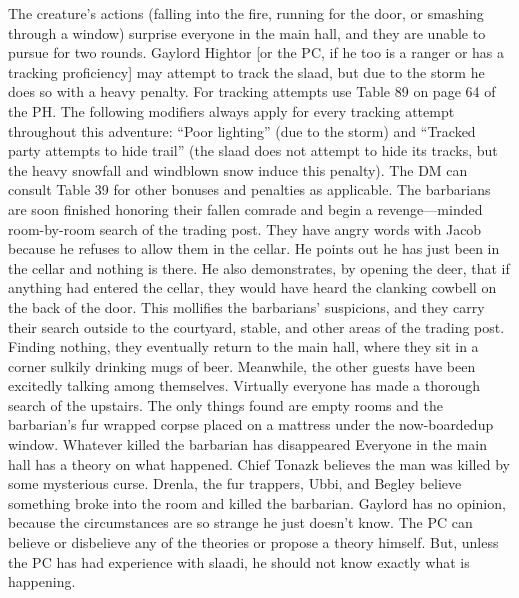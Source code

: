 \documentclass[a5paper,11pt,twoside]{book}
\begin{document}
{{{The creature’s actions (falling into the fire, running for the door, or smashing through a window) surprise everyone in the main hall, and they are unable to pursue for two rounds.
Gaylord Hightor [or the PC, if he too is a ranger or has a tracking proficiency] may attempt to track the slaad, but due to the storm he does so with a heavy penalty.
For tracking attempts use Table 89 on page 64 of the PH.
The following modifiers always apply for every tracking attempt throughout this adventure: “Poor lighting” (due to the storm) and “Tracked party attempts to hide trail” (the slaad does not attempt to hide its tracks, but the heavy snowfall and windblown snow induce this penalty).
The DM can consult Table 39 for other bonuses and penalties as applicable.
The barbarians are soon finished honoring their fallen comrade and begin a revenge—minded room-by-room search of the trading post.
They have angry words with Jacob because he refuses to allow them in the cellar.
He points out he has just been in the cellar and nothing is there.
He also demonstrates, by opening the deer, that if anything had entered the cellar, they would have heard the clanking cowbell on the back of the door.
This mollifies the barbarians’ suspicions, and they carry their search outside to the courtyard, stable, and other areas of the trading post.
Finding nothing, they eventually return to the main hall, where they sit in a corner sulkily drinking mugs of beer.
Meanwhile, the other guests have been excitedly talking among themselves.
Virtually everyone has made a thorough search of the upstairs.
The only things found are empty rooms and the barbarian’s fur wrapped corpse placed on a mattress under the now-boardedup window.
Whatever killed the barbarian has disappeared  Everyone in the main hall has a theory on what happened.
Chief Tonazk believes the man was killed by some mysterious curse.
Drenla, the fur trappers, Ubbi, and Begley believe something broke into the room and killed the barbarian.
Gaylord has no opinion, because the circumstances are so strange he just doesn’t know.
The PC can believe or disbelieve any of the theories or propose a theory himself.
But, unless the PC has had experience with slaadi, he should not know exactly what is happening.

}}}
\end{document}
